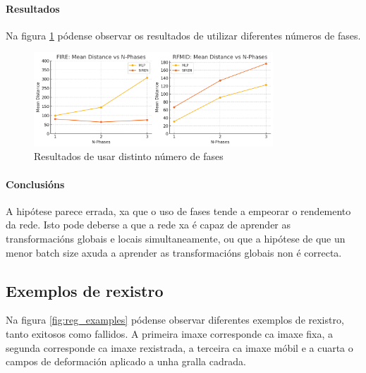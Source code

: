 \paragraph{Resultados}
\label{par:Resultados-phases}

Na figura \ref{fig:nphases} pódense observar os resultados de utilizar diferentes números de fases.
\begin{figure}[ht]
    \centering
    \includegraphics[width=0.8\textwidth]{imaxes/lottery/nphases.png}
    \caption{Resultados de usar distinto número de fases}
    \label{fig:nphases}
\end{figure}

\FloatBarrier

\paragraph{Conclusións}
\label{par:Conclusions-phases}

A hipótese parece errada, xa que o uso de fases tende a empeorar o rendemento da rede.
Isto pode deberse a que a rede xa é capaz de aprender as transformacións globais e locais simultaneamente, ou que a hipótese de que un menor batch size axuda a aprender as transformacións globais non é correcta.

\subsection{Exemplos de rexistro}
\label{subsec:Exemplos de rexistro}

Na figura \ref{fig:reg_examples} pódense observar diferentes exemplos de rexistro, tanto exitosos como fallidos.
A primeira imaxe corresponde ca imaxe fixa, a segunda corresponde ca imaxe rexistrada, a terceira ca imaxe móbil e a cuarta o campos de deformación aplicado a unha gralla cadrada.

